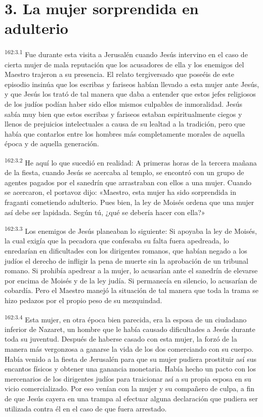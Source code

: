 \section*{3. La mujer sorprendida en adulterio}
\par 
\textsuperscript{162:3.1} Fue durante esta visita a Jerusalén cuando Jesús intervino en el caso de cierta mujer de mala reputación que los acusadores de ella y los enemigos del Maestro trajeron a su presencia. El relato tergiversado que poseéis de este episodio insinúa que los escribas y fariseos habían llevado a esta mujer ante Jesús, y que Jesús los trató de tal manera que daba a entender que estos jefes religiosos de los judíos podían haber sido ellos mismos culpables de inmoralidad. Jesús sabía muy bien que estos escribas y fariseos estaban espiritualmente ciegos y llenos de prejuicios intelectuales a causa de su lealtad a la tradición, pero que había que contarlos entre los hombres más completamente morales de aquella época y de aquella generación.

\par 
\textsuperscript{162:3.2} He aquí lo que sucedió en realidad: A primeras horas de la tercera mañana de la fiesta, cuando Jesús se acercaba al templo, se encontró con un grupo de agentes pagados por el sanedrín que arrastraban con ellos a una mujer. Cuando se acercaron, el portavoz dijo: «Maestro, esta mujer ha sido sorprendida in fraganti cometiendo adulterio. Pues bien, la ley de Moisés ordena que una mujer así debe ser lapidada. Según tú, ¿qué se debería hacer con ella?»

\par 
\textsuperscript{162:3.3} Los enemigos de Jesús planeaban lo siguiente: Si apoyaba la ley de Moisés, la cual exigía que la pecadora que confesaba su falta fuera apedreada, lo enredarían en dificultades con los dirigentes romanos, que habían negado a los judíos el derecho de infligir la pena de muerte sin la aprobación de un tribunal romano. Si prohibía apedrear a la mujer, lo acusarían ante el sanedrín de elevarse por encima de Moisés y de la ley judía. Si permanecía en silencio, lo acusarían de cobardía. Pero el Maestro manejó la situación de tal manera que toda la trama se hizo pedazos por el propio peso de su mezquindad.

\par 
\textsuperscript{162:3.4} Esta mujer, en otra época bien parecida, era la esposa de un ciudadano inferior de Nazaret, un hombre que le había causado dificultades a Jesús durante toda su juventud. Después de haberse casado con esta mujer, la forzó de la manera más vergonzosa a ganarse la vida de los dos comerciando con su cuerpo. Había venido a la fiesta de Jerusalén para que su mujer pudiera prostituir así sus encantos físicos y obtener una ganancia monetaria. Había hecho un pacto con los mercenarios de los dirigentes judíos para traicionar así a su propia esposa en su vicio comercializado. Por eso venían con la mujer y su compañero de culpa, a fin de que Jesús cayera en una trampa al efectuar alguna declaración que pudiera ser utilizada contra él en el caso de que fuera arrestado.

